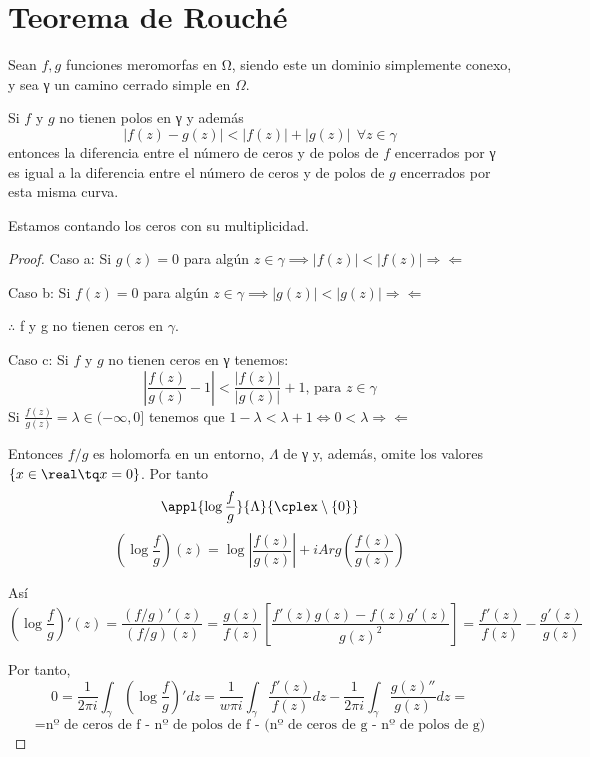 \documentclass{apuntes}
\begin{document}
\section{Teorema de Rouché}
\begin{theorem}
Sean $f,g$ funciones meromorfas en Ω, siendo este un dominio simplemente conexo, y sea γ un camino cerrado simple en $\Omega$.

Si $f$ y $g$ no tienen polos en γ y además
\[|f(z)-g(z)| < |f(z)|+|g(z)| \ \ \forall z \in γ\]
entonces la diferencia entre el número de ceros y de polos de $f$ encerrados por γ es igual a la diferencia entre el número de ceros y de polos de $g$ encerrados por esta misma curva.

\obs Estamos contando los ceros con su multiplicidad.
\end{theorem}
\begin{proof}

Caso a: Si $g(z)=0$ para algún $z \in γ \implies |f(z)|<|f(z)| \Rightarrow\Leftarrow$

Caso b: Si $f(z)=0$ para algún $z \in γ \implies |g(z)|<|g(z)| \Rightarrow\Leftarrow$

$\therefore$ f y g no tienen ceros en $\gamma$.

Caso c: Si $f$ y $g$ no tienen ceros en γ tenemos:
\[\left| \frac{f(z)}{g(z)}-1\right| < \frac{|f(z)|}{|g(z)|}+1 \text{, para } z \in \gamma\]
Si $\frac{f(z)}{g(z)}=λ\in (-\infty, 0]$ tenemos que $1-λ<λ+1 \iff 0 < \lambda \Rightarrow\Leftarrow$

Entonces $f/g$ es holomorfa en un entorno, $\Lambda$ de γ y, además, omite los valores $\{x \in \real \tq x=0\}$. Por tanto
\[\appl{\log\frac{f}{g}}{\Lambda}{\cplex \setminus \{0\}}\]
\[\left( \log \frac{f}{g}\right) (z) = \log \left|\frac{f(z)}{g(z)}\right| + i Arg \left(\frac{f(z)}{g(z)}\right)\]

Así
\[\left( \log \frac{f}{g}\right)'(z)=\frac{(f/g)'(z)}{(f/g)(z)}=\frac{g(z)}{f(z)}\left[ \frac{f'(z)g(z)-f(z)g'(z)}{g(z)^2} \right] = \frac{f'(z)}{f(z)}-\frac{g'(z)}{g(z)}\]

Por tanto,
\[0 = \frac{1}{2πi}\int_γ \left( \log \frac{f}{g}\right)'dz = \frac{1}{wπi}\int_γ \frac{f'(z)}{f(z)}dz - \frac{1}{2πi}\int_γ \frac{g(z)''}{g(z)}dz =\]
\[=\text{nº de ceros de f - nº de polos de f - (nº de ceros de g - nº de polos de g)}\]
\end{proof}
\end{document}
